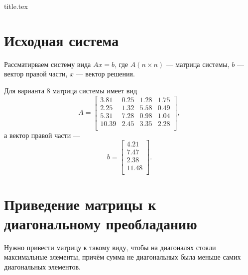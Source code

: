 




{title.tex}

\clearpage


\pagestyle{empty}
\thispagestyle{empty}
\tableofcontents

\clearpage
{}
\pagestyle{fancy}
\setcounter{page}{2}

\clearpage

\chapter{Исходная система}

Рассматирваем систему вида $Ax = b$, где $A \left( n \times n \right) $ --- матрица системы, $b$ ---
вектор правой части, $x$ --- вектор решения.

Для варианта 8 матрица системы имеет вид
\begin{equation*}
A =
\begin{bmatrix}
    3.81 & 0.25 & 1.28 & 1.75 \\
    2.25 & 1.32 & 5.58 & 0.49 \\
    5.31 & 7.28 & 0.98 & 1.04 \\
    10.39 & 2.45 & 3.35 & 2.28 \\
\end{bmatrix},
\end{equation*}
а вектор правой части ---
\begin{equation*}
b =
\begin{bmatrix}
    4.21 \\
    7.47 \\
    2.38 \\
    11.48 \\
\end{bmatrix}.
\end{equation*}

\chapter{Приведение матрицы к диагональному преобладанию}

Нужно привести матрицу к такому виду, чтобы на диагоналях стояли максимальные элементы,
причём сумма не диагональных была меньше самих диагональных элементов.

